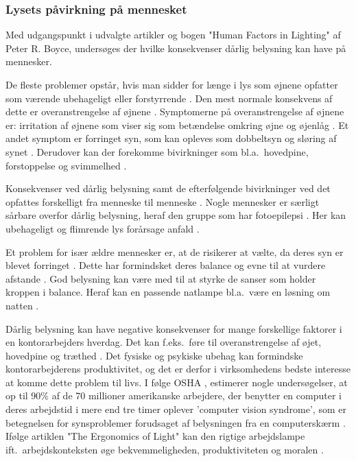\subsubsection{Lysets påvirkning på mennesket} 
\label{sec:konsekvenser}

Med udgangspunkt i udvalgte artikler og bogen "Human Factors in Lighting" af Peter R. Boyce, undersøges der hvilke konsekvenser dårlig belysning kan have på mennesker. 

De fleste problemer opstår, hvis man sidder for længe i lys som øjnene opfatter som værende ubehageligt eller forstyrrende \cite{human_factors}. Den mest normale konsekvens af dette er overanstrengelse af øjnene \cite{human_factors}. Symptomerne på overanstrengelse af øjnene er: irritation af øjnene som viser sig som betændelse omkring øjne og øjenlåg \cite{human_factors}. Et andet symptom er forringet syn, som kan opleves som dobbeltsyn og sløring af synet \cite{human_factors}. Derudover kan der forekomme bivirkninger som bl.a.\ hovedpine, forstoppelse og svimmelhed \cite{human_factors}.

Konsekvenser ved dårlig belysning samt de efterfølgende bivirkninger ved det opfattes forskelligt fra menneske til menneske \cite{human_factors}. Nogle mennesker er særligt sårbare overfor dårlig belysning, heraf den gruppe som har fotoepilepsi \cite{human_factors}. Her kan ubehageligt og flimrende lys forårsage anfald \cite{human_factors}. 

Et problem for især ældre mennesker er, at de risikerer at vælte, da deres syn er blevet forringet \cite{human_factors}. Dette har formindsket deres balance og evne til at vurdere afstande \cite{human_factors}. God belysning kan være med til at styrke de sanser som holder kroppen i balance. Heraf kan en passende natlampe bl.a.\ være en løsning om natten \cite{human_factors}. 

Dårlig belysning kan have negative konsekvenser for mange forskellige faktorer i en kontorarbejders hverdag. Det kan f.eks.\ føre til overanstrengelse af øjet, hovedpine og træthed \cite{ergonomi_arbejdsplads}. Det fysiske og psykiske ubehag kan formindske kontorarbejderens produktivitet, og det er derfor i virksomhedens bedste interesse at komme dette problem til livs. I følge OSHA \cite{OSHA}, estimerer nogle undersøgelser, at op til 90\% af de 70 millioner amerikanske arbejdere, der benytter en computer i deres arbejdstid i mere end tre timer oplever 'computer vision syndrome', som er betegnelsen for synsproblemer forudsaget af belysningen fra en computerskærm \cite{CVS}. Ifølge artiklen "The Ergonomics of Light" kan den rigtige arbejdslampe ift.\ arbejdskonteksten øge bekvemmeligheden, produktiviteten og moralen \cite{ergonomi_arbejdsplads}. 